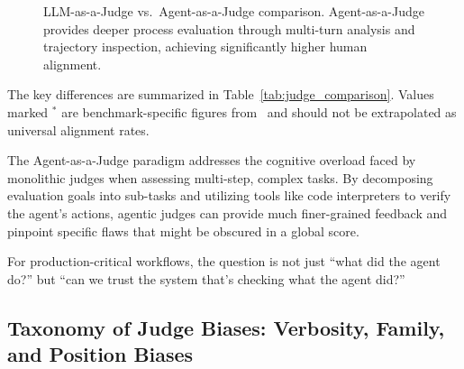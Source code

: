 \begin{figure}[htbp]
\centering

\caption{LLM-as-a-Judge vs.\ Agent-as-a-Judge comparison. Agent-as-a-Judge provides deeper process evaluation through multi-turn analysis and trajectory inspection, achieving significantly higher human alignment.}
\label{fig:judge_comparison}
\end{figure}

The key differences are summarized in Table~\ref{tab:judge_comparison}. Values marked $^{*}$ are benchmark-specific figures from~\citet{agent_as_judge_icml} and should not be extrapolated as universal alignment rates.

\begin{table}[htbp]
\centering
\caption{LLM-as-a-Judge vs.\ Agent-as-a-Judge across key dimensions.}
\label{tab:judge_comparison}
\end{table}

The Agent-as-a-Judge paradigm addresses the cognitive overload faced by monolithic judges when assessing multi-step, complex tasks. By decomposing evaluation goals into sub-tasks and utilizing tools like code interpreters to verify the agent's actions, agentic judges can provide much finer-grained feedback and pinpoint specific flaws that might be obscured in a global score.

For production-critical workflows, the question is not just ``what did the agent do?'' but ``can we trust the system that's checking what the agent did?''

\subsection{Taxonomy of Judge Biases: Verbosity, Family, and Position Biases}

